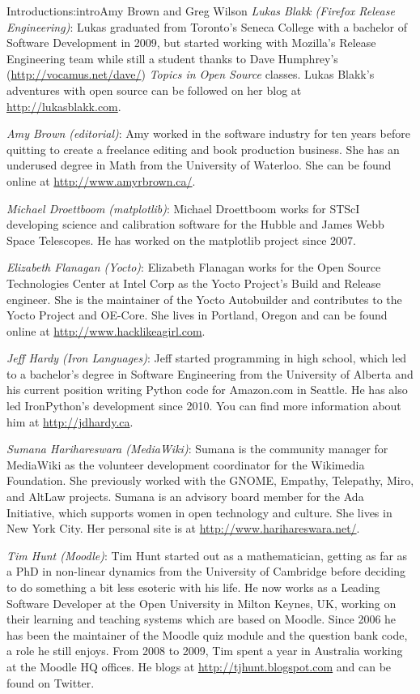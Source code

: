 \begin{aosachapter}{Introduction}{s:intro}{Amy Brown and Greg Wilson}
\emph{Lukas Blakk (Firefox Release Engineering)}: Lukas graduated from
Toronto's Seneca College with a bachelor of Software Development
in 2009, but started working with Mozilla's Release Engineering team while
still a student thanks to Dave Humphrey's (\url{http://vocamus.net/dave/})
\emph{Topics in Open Source} classes. Lukas Blakk's adventures with open source
can be followed on her blog at \url{http://lukasblakk.com}.

\emph{Amy Brown (editorial)}: Amy worked in the software industry for
ten years before quitting to create a freelance editing and book production
business. She has an underused degree in Math from the University of
Waterloo. She can be found online at \url{http://www.amyrbrown.ca/}.

\emph{Michael Droettboom (matplotlib)}: Michael Droettboom works for STScI
developing science and calibration software for the Hubble and James Webb Space
Telescopes. He has worked on the matplotlib project since 2007. 

\emph{Elizabeth Flanagan (Yocto)}: Elizabeth Flanagan works for the Open Source
Technologies Center at Intel Corp as the Yocto Project's Build and Release
engineer. She is the maintainer of the Yocto Autobuilder and contributes to the
Yocto Project and OE-Core.  She lives in Portland, Oregon and can be found
online at \url{http://www.hacklikeagirl.com}.

\emph{Jeff Hardy (Iron Languages)}: Jeff started programming in high school,
which led to a bachelor's degree in Software Engineering from the University of
Alberta and his current position writing Python code for Amazon.com in Seattle.
He has also led IronPython's development since 2010. You can find more
information about him at \url{http://jdhardy.ca}.

\emph{Sumana Harihareswara (MediaWiki)}: Sumana is the community manager for
MediaWiki as the volunteer development coordinator for the Wikimedia
Foundation. She previously worked with the GNOME, Empathy, Telepathy,
Miro, and AltLaw projects. Sumana is an advisory board member for the
Ada Initiative, which supports women in open technology and culture.
She lives in New York City. Her personal site is at
\url{http://www.harihareswara.net/}.

\emph{Tim Hunt (Moodle)}: Tim Hunt started out as a mathematician, getting as
far as a PhD in non-linear dynamics from the University of Cambridge before
deciding to do something a bit less esoteric with his life. He now works as a
Leading Software Developer at the Open University in Milton Keynes, UK, working
on their learning and teaching systems which are based on Moodle. Since 2006 he
has been the maintainer of the Moodle quiz module and the question bank code, a
role he still enjoys. From 2008 to 2009, Tim spent a year in Australia working
at the Moodle HQ offices. He blogs at \url{http://tjhunt.blogspot.com} and can 
be found  on Twitter.


\end{aosachapter}
